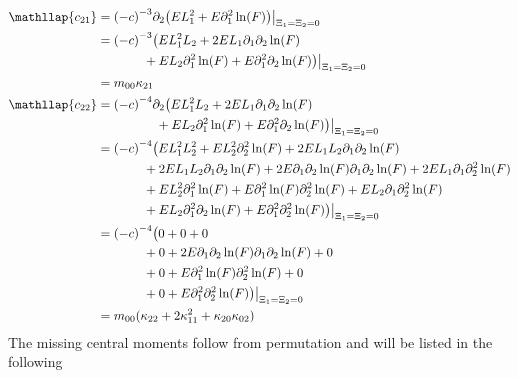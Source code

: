 \begin{align*}
  &\begin{aligned}
  \nonumber
    \mathllap{c_{21}} & = {(-c)}^{-3} \partial_2 \big(EL_1^2 + E \partial_1^2\ln(F)\big)  \bigr|_{\Xi_1=\Xi_2 = 0} \\
    & = {(-c)}^{-3} \big( E L_1^2 L_2 + 2EL_1\partial_1\partial_2\ln(F) \\
      &\qquad\quad\ \ + EL_2 \partial_1^2\ln(F) + E \partial_1^2\partial_2\ln(F) \big)  \bigr|_{\Xi_1=\Xi_2 = 0} \\
    & = m_{00}\kappa_{21}
  \end{aligned}\\
  &\begin{aligned}
  \nonumber
    \mathllap{c_{22}} & = {(-c)}^{-4} \partial_2 \big( E L_1^2 L_2 + 2EL_1\partial_1\partial_2\ln(F) \\
      &\qquad\qquad\ \ + EL_2 \partial_1^2\ln(F) + E \partial_1^2\partial_2\ln(F) \big)  \bigr|_{\Xi_1=\Xi_2 = 0} \\
    & = {(-c)}^{-4} \big(
      E L_1^2 L_2^2 + E L_2^2 \partial_2^2\ln(F) + 2 E L_1 L_2 \partial_1\partial_2 \ln(F) \\
    & \qquad\quad\ \ +
      2 E L_1 L_2 \partial_1\partial_2 \ln(F) + 2 E \partial_1\partial_2 \ln(F) \partial_1\partial_2 \ln(F) + 2 E L_1 \partial_1\partial_2^2 \ln(F) \\
    & \qquad\quad\ \ +
      E L_2^2 \partial_1^2 \ln(F) + E \partial_1^2 \ln(F) \partial_2^2 \ln(F) + E L_2 \partial_1\partial_2^2 \ln(F) \\
    & \qquad\quad\ \ +
      E L_2 \partial_1^2 \partial_2 \ln(F) + E\partial_1^2\partial_2^2 \ln(F)
      \big) \bigr|_{\Xi_1=\Xi_2 = 0} \\
    & = {(-c)}^{-4} \big(
    0 + 0 + 0 \\
    & \qquad\quad\ \ +
      0 + 2 E \partial_1\partial_2 \ln(F) \partial_1\partial_2 \ln(F) + 0 \\
    & \qquad\quad\ \ +
      0 + E \partial_1^2 \ln(F) \partial_2^2 \ln(F) + 0 \\
    & \qquad\quad\ \ +
      0 + E\partial_1^2\partial_2^2 \ln(F)
      \big) \bigr|_{\Xi_1=\Xi_2 = 0} \\
    & = m_{00}(\kappa_{22} + 2\kappa_{11}^2 + \kappa_{20}\kappa_{02})
  \end{aligned}
\end{align*}
The missing central moments follow from permutation and will be listed in the following


